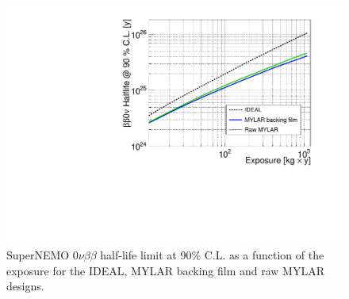 \documentclass[main.tex]{subfiles}
\begin{document}



\begin{figure}[h!]
\centering
\includegraphics[scale=0.7]{pictures/Chap4/rawMylar.pdf}
\caption{SuperNEMO 0$\nu\beta\beta$ half-life limit at 90\% C.L. as a function of the exposure for the IDEAL, MYLAR backing film and raw MYLAR designs.}
\label{RawMylarDesignComparison}
\end{figure}
\end{document}
